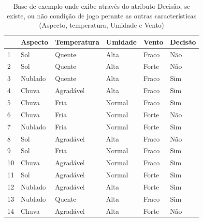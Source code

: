 \begin{table}[!ht]
\centering
\begin{tabular}{|l|l|l|l|l|l|}
\hline \hline 
\rowcolor[HTML]{EFEFEF} 
     & Aspecto   & Temperatura  & Umidade   & Vento    & Decisão \\ \hline
1       & Sol       & Quente        & Alta   & Fraco       & Não \\ \hline                    
2       & Sol       & Quente        & Alta   & Forte       & Não \\ \hline
3       & Nublado   & Quente        & Alta   & Fraco       & Sim \\ \hline                    
4       & Chuva     & Agradável     & Alta   & Fraco       & Sim \\ \hline
5       & Chuva     & Fria          & Normal   & Fraco       & Sim \\ \hline                    
6       & Chuva     & Fria          & Normal   & Forte       & Não \\ \hline
7       & Nublado   & Fria          & Normal   & Forte       & Sim \\ \hline                    
8       & Sol       & Agradável     & Alta   & Fraco       & Não \\ \hline
9       & Sol       & Fria          & Normal   & Fraco       & Sim \\ \hline                    
10       & Chuva    & Agradável     & Normal   & Fraco       & Sim \\ \hline
11       & Sol      & Agradável     & Normal   & Forte       & Sim \\ \hline                    
12       & Nublado  & Agradável     & Alta   & Forte       & Sim \\ \hline
13       & Nublado  & Quente        & Alta   & Fraco       & Sim \\ \hline                    
14       & Chuva    & Agradável     & Alta   & Forte       & Não \\ \hline
\end{tabular}
\caption{Base de exemplo onde exibe através do atributo Decisão, se existe, ou não condição de jogo perante as outras características (Aspecto, temperatura, Umidade e Vento)}
\label{tab:exemploNB}
\end{table}

